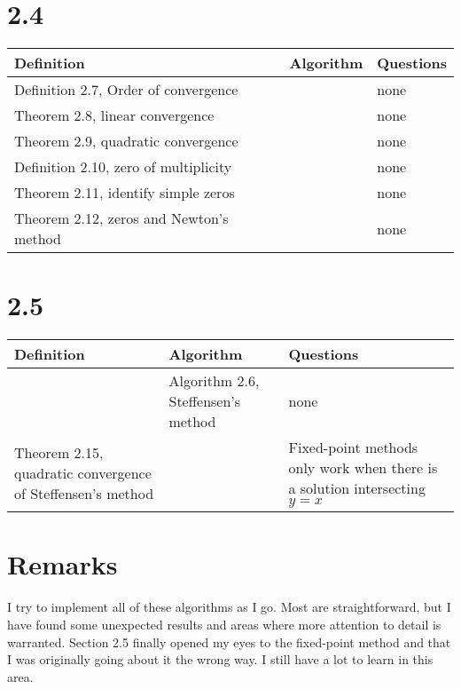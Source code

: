 \documentclass{article}
\begin{document}
\section*{2.4}

\begin{tabularx}{\textwidth}{ |X|X|X| }
    \hline
	{\bf Definition} & {\bf Algorithm} & {\bf Questions} \\
    \hline
	Definition 2.7, Order of convergence & & none \\
    \hline
	Theorem 2.8, linear convergence & & none \\
    \hline
	Theorem 2.9, quadratic convergence & & none \\
    \hline
	Definition 2.10, zero of multiplicity & & none \\
    \hline
	Theorem 2.11, identify simple zeros & & none \\
    \hline
	Theorem 2.12, zeros and Newton's method & & none \\
    \hline
\end{tabularx}

\section*{2.5}

\begin{tabularx}{\textwidth}{ |X|X|X| }
    \hline
	{\bf Definition} & {\bf Algorithm} & {\bf Questions} \\
    \hline
	 & Algorithm 2.6, Steffensen's method & none \\
    \hline
	Theorem 2.15, quadratic convergence of Steffensen's method & & Fixed-point methods only work when there is a solution intersecting $y=x$ \\
    \hline
\end{tabularx}

\section*{Remarks}

I try to implement all of these algorithms as I go.
Most are straightforward, but I have found some unexpected results and areas where more attention to detail is warranted.
Section 2.5 finally opened my eyes to the fixed-point method and that I was originally going about it the wrong way.
I still have a lot to learn in this area.
\end{document}
